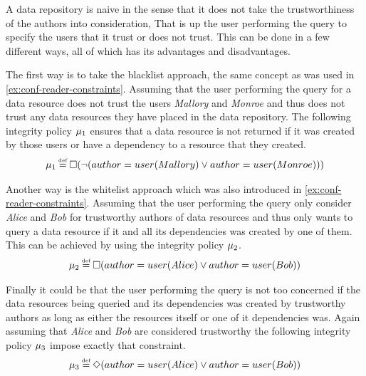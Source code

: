 \begin{example}
A data repository is naive in the sense that it does not take the trustworthiness of the authors into consideration, That is up the user performing the query to specify the users that it trust or does not trust. This can be done in a few different ways, all of which has its advantages and disadvantages.

The first way is to take the blacklist approach, the same concept as was used in \autoref{ex:conf-reader-constraints}. Assuming that the user performing the query for a data resource does not trust the users \emph{Mallory} and \emph{Monroe} and thus does not trust any data resources they have placed in the data repository. The following integrity policy $\mu_1$ ensures that a data resource is not returned if it was created by those users or have a dependency to a resource that they created.
\begin{align*}
    \inte_1 \eqdef \G( \lnot (author = user(Mallory) \lor author = user(Monroe)))
\end{align*}

Another way is the whitelist approach which was also introduced in \autoref{ex:conf-reader-constraints}. Assuming that the user performing the query only consider \emph{Alice} and \emph{Bob} for trustworthy authors of data resources and thus only wants to query a data resource if it and all its dependencies was created by one of them. This can be achieved by using the integrity policy $\mu_2$.
\begin{align*}
    \inte_2 \eqdef \G(author = user(Alice) \lor author = user(Bob))
\end{align*}

Finally it could be that the user performing the query is not too concerned if the data resources being queried and its dependencies was created by trustworthy authors as long as either the resources itself or one of it dependencies was. Again assuming that \emph{Alice} and \emph{Bob} are considered trustworthy the following integrity policy $\mu_3$ impose exactly that constraint.
\begin{align*}
    \inte_3 \eqdef \F(author = user(Alice) \lor author = user(Bob))
\end{align*}
\end{example}